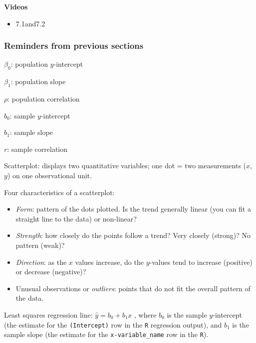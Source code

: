 \documentclass[
]{report}
\providecommand{\tightlist}{%
  \setlength{\itemsep}{0pt}\setlength{\parskip}{0pt}}
\begin{document}
\textbf{Videos}

\begin{itemize}
\tightlist
\item
  7.1and7.2
\end{itemize}


\hypertarget{reminders-from-previous-sections-7}{%
\subsubsection*{Reminders from previous sections}\label{reminders-from-previous-sections-7}}

\(\beta_0\): population \(y\)-intercept

\(\beta_1\): population slope

\(\rho\): population correlation

\(b_0\): sample \(y\)-intercept

\(b_1\): sample slope

\(r\): sample correlation

Scatterplot: displays two quantitative variables; one dot = two measurements (\(x\), \(y\)) on one observational unit.

Four characteristics of a scatterplot:

\begin{itemize}
\tightlist
\item
  \emph{Form}: pattern of the dots plotted. Is the trend generally linear (you can fit a straight line to the data) or non-linear?\\
\item
  \emph{Strength}: how closely do the points follow a trend? Very closely (strong)? No pattern (weak)?\\
\item
  \emph{Direction}: as the \(x\) values increase, do the \(y\)-values tend to increase (positive) or decrease (negative)?\\
\item
  Unusual observations or \emph{outliers}: points that do not fit the overall pattern of the data.
\end{itemize}


Least squares regression line: \(\hat{y} = b_0+b_1x\) , where \(b_0\) is the sample \(y\)-intercept (the estimate for the \texttt{(Intercept)} row in the \texttt{R} regression output), and \(b_1\) is the sample slope (the estimate for the \texttt{x-variable\_name} row in the \texttt{R}).
\end{document}
